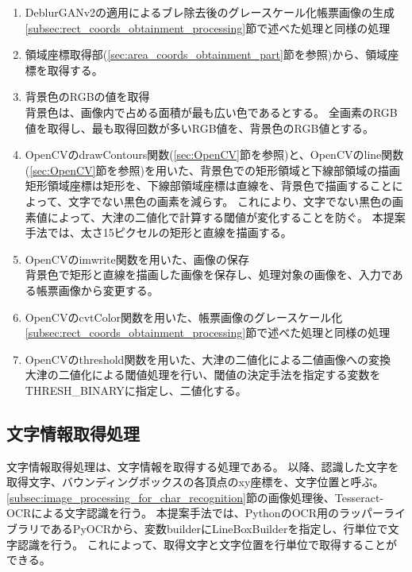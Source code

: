 \begin{enumerate}
    \item DeblurGANv2の適用によるブレ除去後のグレースケール化帳票画像の生成\\
        \ref{subsec:rect_coords_obtainment_processing}節で述べた処理と同様の処理
    \item 領域座標取得部(\ref{sec:area_coords_obtainment_part}節を参照)から、領域座標を取得する。
    \item 背景色のRGBの値を取得\\
        背景色は、画像内で占める面積が最も広い色であるとする。
        全画素のRGB値を取得し、最も取得回数が多いRGB値を、背景色のRGB値とする。
    \item OpenCVのdrawContours関数(\ref{sec:OpenCV}節を参照)と、OpenCVのline関数(\ref{sec:OpenCV}節を参照)を用いた、背景色での矩形領域と下線部領域の描画\\
        矩形領域座標は矩形を、下線部領域座標は直線を、背景色で描画することによって、文字でない黒色の画素を減らす。
        これにより、文字でない黒色の画素値によって、大津の二値化で計算する閾値が変化することを防ぐ。
        本提案手法では、太さ15ピクセルの矩形と直線を描画する。
    \item OpenCVのimwrite関数を用いた、画像の保存\\
        背景色で矩形と直線を描画した画像を保存し、処理対象の画像を、入力である帳票画像から変更する。
    \item OpenCVのcvtColor関数を用いた、帳票画像のグレースケール化\\
        \ref{subsec:rect_coords_obtainment_processing}節で述べた処理と同様の処理
    \item OpenCVのthreshold関数を用いた、大津の二値化による二値画像への変換\\
        大津の二値化による閾値処理を行い、閾値の決定手法を指定する変数をTHRESH\_BINARYに指定し、二値化する。
\end{enumerate}

\subsection{文字情報取得処理}\label{subsec:char_information_obtainment_processing}
文字情報取得処理は、文字情報を取得する処理である。
以降、認識した文字を取得文字、バウンディングボックスの各頂点のxy座標を、文字位置と呼ぶ。
\ref{subsec:image_processing_for_char_recognition}節の画像処理後、Tesseract-OCRによる文字認識を行う。
本提案手法では、PythonのOCR用のラッパーライブラリであるPyOCRから、変数builderにLineBoxBuilderを指定し、行単位で文字認識を行う。
これによって、取得文字と文字位置を行単位で取得することができる。

